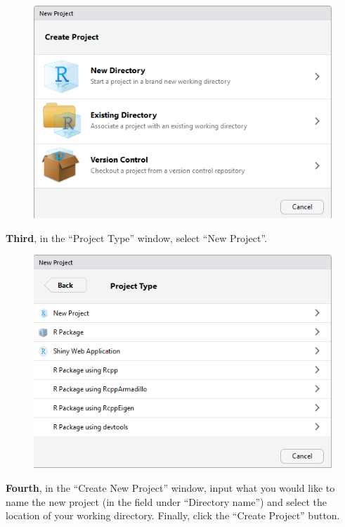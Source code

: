 \documentclass[]{book}
\begin{document}
\begin{figure}
\centering
\includegraphics{Project Window.png}
\caption{}
\end{figure}

\textbf{Third}, in the ``Project Type'' window, select ``New Project''.

\begin{figure}
\centering
\includegraphics{Project Type.png}
\caption{}
\end{figure}

\textbf{Fourth}, in the ``Create New Project'' window, input what you
would like to name the new project (in the field under ``Directory
name'') and select the location of your working directory. Finally,
click the ``Create Project'' button.
\end{document}
